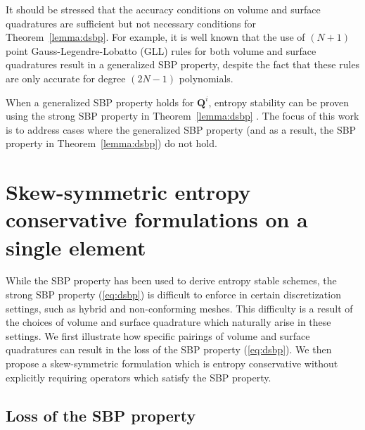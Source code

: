 \documentclass{svjour3}                     %
\renewcommand{\hat}{\widehat}
\newcommand{\LRp}[1]{\left( #1 \right)}
\begin{document}
\begin{remark}
It should be stressed that the accuracy conditions on volume and surface quadratures are sufficient but not necessary conditions for Theorem~\ref{lemma:dsbp}.  For example, it is well known that the use of $(N+1)$ point Gauss-Legendre-Lobatto (GLL) rules for both volume and surface quadratures result in a generalized SBP property, despite the fact that these rules are only accurate for degree $(2N-1)$ polynomials.  
\label{remark:dsbp}
\end{remark}

When a generalized SBP property holds for $\bm{Q}^i$, entropy stability can be proven using the strong SBP property in Theorem~\ref{lemma:dsbp} \cite{chan2017discretely, chan2018discretely}.  The focus of this work is to address cases where the generalized SBP property (and as a result, the SBP property in Theorem~\ref{lemma:dsbp}) do not hold. 

\section{Skew-symmetric entropy conservative formulations on a single element}
\label{sec:skew1}
While the SBP property has been used to derive entropy stable schemes, the strong SBP property (\ref{eq:dsbp}) is difficult to enforce in certain discretization settings, such as hybrid and non-conforming meshes.  This difficulty is a result of the choices of volume and surface quadrature which naturally arise in these settings.  We first illustrate how specific pairings of volume and surface quadratures can result in the loss of the SBP property (\ref{eq:dsbp}).  We then propose a skew-symmetric formulation which is entropy conservative without explicitly requiring operators which satisfy the SBP property.  

\subsection{Loss of the SBP property}
\end{document}
